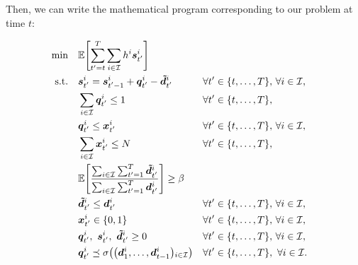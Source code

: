 Then, we can write the mathematical program corresponding to our problem at time $t$:


\begin{subequations}\label{eq:Uniform-CLSP-BS:service-level}
  \begin{align}
    \min\quad & \rlap{$\ds \espe\sqbracket{\sum_{t'=t}^{\horizon} \sum_{i\in\REF} \holding^i\va\inventory_{t'}^i}$}
    \label{eq:Uniform-CLSP-BS:service-level:objective}
    \\
    \st\quad & \ds \va\inventory_{t'}^i = \va\inventory_{t'-1}^i + \va\quantity_{t'}^i - \va\supplied_{t'}^i && \forall t'\in\range[t]{\horizon},\, \forall i\in\REF,
    \label{eq:Uniform-CLSP-BS:service-level:inventory-dynamic}
    \\
    & \ds \sum_{i\in\REF} \va\quantity_{t'}^i \le 1 && \forall t'\in\range[t]{\horizon},
    \label{eq:Uniform-CLSP-BS:service-level:capacity}
    \\
    & \ds \va\quantity_{t'}^i \le \va\setup_{t'}^i && \forall t'\in\range[t]{\horizon},\, \forall i\in\REF,
    \label{eq:Uniform-CLSP-BS:service-level:big-M}
    \\
    & \ds \sum_{i\in\REF} \va\setup_{t'}^i \le \nbsetups && \forall t'\in\range[t]{\horizon},
    \label{eq:Uniform-CLSP-BS:service-level:setups}
    \\
    & \ds \espe\sqbracket{\frac{\sum_{i\in\REF}\sum_{t'=1}^{\horizon}\va\supplied_{t'}^i }{\sum_{i\in\REF}\sum_{t'=1}^{\horizon}\va\demand_{t'}^i}} \ge \servicelvl
    \label{eq:Uniform-CLSP-BS:service-level:service-level}
    \\
    & \ds \va\supplied_{t'}^i \le \va\demand_{t'}^i && \forall t'\in\range[t]{\horizon},\, \forall i\in\REF,
    \label{eq:Uniform-CLSP-BS:service-level:supplied-bound-demand}
    \\
    & \ds \va\setup_{t'}^i \in \crbracket{0,1} && \forall t'\in\range[t]{\horizon},\, \forall i\in\REF,
    \label{eq:Uniform-CLSP-BS:service-level:binary}
    \\
    & \ds \va\quantity_{t'}^i,\ \va\inventory_{t'}^i,\ \va\supplied_{t'}^i \ge 0 && \forall t'\in\range[t]{\horizon},\, \forall i\in\REF,
    \label{eq:Uniform-CLSP-BS:service-level:positity}
    \\
    & \ds \va\quantity_{t'}^i \preceq \Sfield{\bracket{\va\demand_1^i,\ldots,\va\demand_{t-1}^i}_{i\in\REF}} && \forall t'\in\range[t]{\horizon},\ \forall i\in\REF.
    \label{eq:Uniform-CLSP-BS:service-level:measurability}
  \end{align}
\end{subequations}

